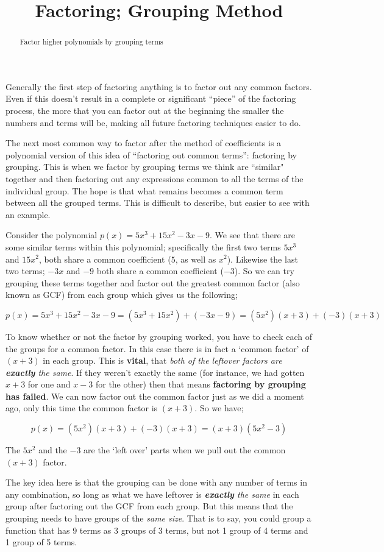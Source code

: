 \documentclass{ximera}
\title{Factoring; Grouping Method}
\begin{document}
\begin{abstract}
    Factor higher polynomials by grouping terms
\end{abstract}
\maketitle


Generally the first step of factoring anything is to factor out any common factors. Even if this doesn't result in a complete or significant ``piece'' of the factoring process, the more that you can factor out at the beginning the smaller the numbers and terms will be, making all future factoring techniques easier to do.

The next most common way to factor after the method of coefficients is a polynomial version of this idea of ``factoring out common terms'': factoring by grouping. This is when we factor by grouping terms we think are ``similar" together and then factoring out any expressions common to all the terms of the individual group. The hope is that what remains becomes a common term between all the grouped terms. This is difficult to describe, but easier to see with an example.

\begin{example}
    Consider the polynomial $p(x) = 5x^3 + 15x^2 - 3x - 9$. We see that there are some similar terms within this polynomial; specifically the first two terms $5x^3$ and $15x^2$, both share a common coefficient ($5$, as well as $x^2$). Likewise the last two terms; $-3x$ and $-9$ both share a common coefficient ($-3$). So we can try grouping these terms together and factor out the greatest common factor (also known as GCF) from each group which gives us the following;
    
    \[
        p(x) = 5x^3 + 15x^2 - 3x - 9 = (5x^3 + 15x^2) + (-3x -9) = (5x^2)(x + 3) + (-3)(x + 3) 
    \]
    
    To know whether or not the factor by grouping worked, you have to check each of the groups for a common factor. In this case there is in fact a `common factor' of $(x + 3)$ in each group. This is \textbf{vital}, that \textit{both of the leftover factors are \textbf{exactly} the same}. If they weren't exactly the same (for instance, we had gotten $x+3$ for one and $x-3$ for the other) then that means \textbf{factoring by grouping has failed}. We can now factor out the common factor just as we did a moment ago, only this time the common factor is $(x + 3)$. So we have;
    
    \[
        p(x) = (5x^2)(x + 3) + (-3)(x + 3) = (x + 3)(5x^2 - 3)
    \]
    
    \noindent The $5x^2$ and the $-3$ are the `left over' parts when we pull out the common $(x + 3)$ factor.
\end{example}
The key idea here is that the grouping can be done with any number of terms in any combination, so long as what we have leftover is \textit{\textbf{exactly} the same} in each group after factoring out the GCF from each group. But this means that the grouping needs to have groups of the \textit{same size}. That is to say, you could group a function that has 9 terms as 3 groups of 3 terms, but not 1 group of 4 terms and 1 group of 5 terms.
\end{document}
